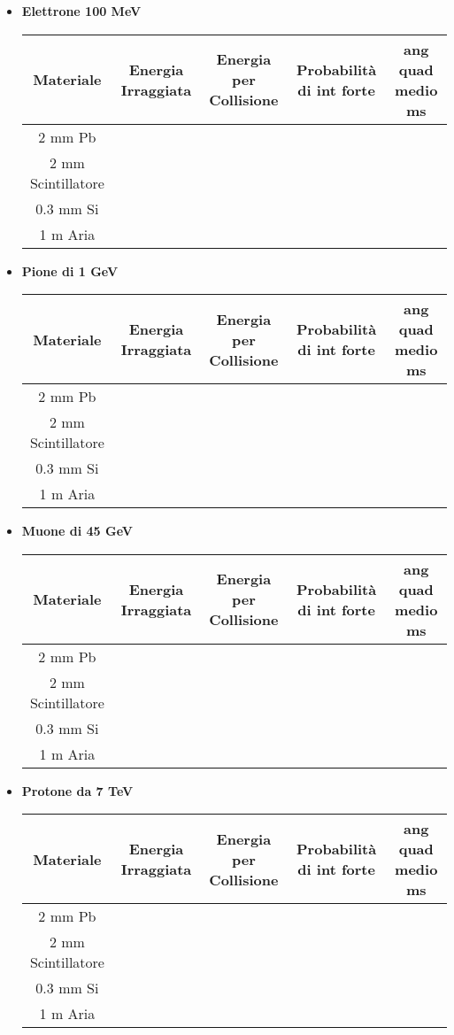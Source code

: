 \documentclass[twoside]{article}
\begin{document}
\begin{itemize}
\item \textbf{Elettrone 100 MeV}
\begin{center}
    \begin{tabular}{|c|c|c|c|c|}
    \hline
   Materiale & Energia Irraggiata & Energia per Collisione & Probabilità di int forte & ang quad medio ms \\
    \hline
         2 mm Pb & & & &  \\
          2 mm Scintillatore & & & & \\
           0.3 mm Si & & & & \\
            1 m Aria & & & & \\
            \hline
    \end{tabular}
\end{center}
\item\textbf{Pione di 1 GeV}
\begin{center}
    \begin{tabular}{|c|c|c|c|c|}
    \hline
   Materiale & Energia Irraggiata & Energia per Collisione & Probabilità di int forte & ang quad medio ms \\
    \hline
         2 mm Pb & & & &  \\
          2 mm Scintillatore & & & & \\
           0.3 mm Si & & & & \\
            1 m Aria & & & & \\
            \hline
    \end{tabular}
\end{center}
\item\textbf{Muone di 45 GeV}
\begin{center}
    \begin{tabular}{|c|c|c|c|c|}
    \hline
   Materiale & Energia Irraggiata & Energia per Collisione & Probabilità di int forte & ang quad medio ms \\
    \hline
         2 mm Pb & & & &  \\
          2 mm Scintillatore & & & & \\
           0.3 mm Si & & & & \\
            1 m Aria & & & & \\
            \hline
    \end{tabular}
\end{center}
\item\textbf{Protone da 7 TeV}

\begin{center}
    \begin{tabular}{|c|c|c|c|c|}
    \hline
   Materiale & Energia Irraggiata & Energia per Collisione & Probabilità di int forte & ang quad medio ms \\
    \hline
         2 mm Pb & & & &  \\
          2 mm Scintillatore & & & & \\
           0.3 mm Si & & & & \\
            1 m Aria & & & & \\
            \hline
    \end{tabular}
\end{center}






\end{itemize}
\end{document}

